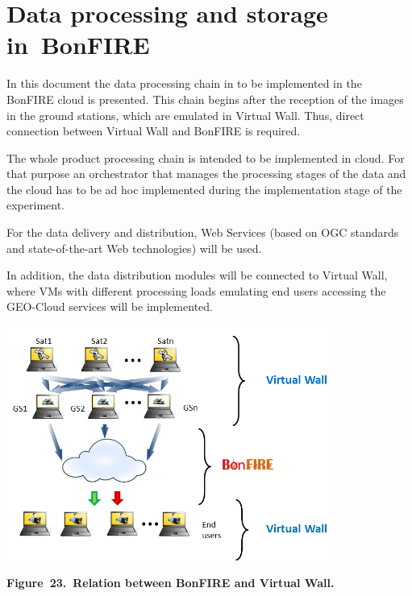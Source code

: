 \documentclass[a4paper]{article}
\begin{document}
\bigskip

\section[Data processing and storage in\ BonFIRE]{Data processing and
storage in\ BonFIRE}
\label{bkm:Ref378929340}\hypertarget{Toc381777209}{}
\bigskip

In this document the data processing chain in to be implemented in the
BonFIRE cloud is presented. This chain begins after the reception of
the images in the ground stations, which are emulated in Virtual Wall.
Thus, direct connection between Virtual Wall and BonFIRE is required.


\bigskip

The whole product processing chain is intended to be implemented in
cloud. For that purpose an orchestrator that manages the processing
stages of the data and the cloud has to be ad hoc implemented during
the implementation stage of the experiment.


\bigskip

For the data delivery and distribution, Web Services (based on OGC
standards and state-of-the-art Web technologies) will be used.\ 


\bigskip

In addition, the data distribution modules will be connected to Virtual
Wall, where VMs with different processing loads emulating end users
accessing the GEO-Cloud services will be implemented.


\bigskip


\bigskip

{\centering 
\includegraphics[width=4.24881in,height=3.02652in]{out-img30.png} \par}

{\centering\bfseries
Figure\ 23.\ Relation between BonFIRE and Virtual Wall.
\par}
\end{document}
